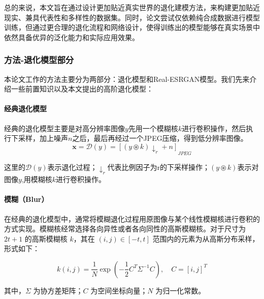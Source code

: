 \documentclass[12pt,AutoFakeBold]{article}
\begin{document}
总的来说，本文旨在通过设计更加贴近真实世界的退化建模方法，来构建更加贴近现实、兼具代表性和多样性的数据集。同时，论文尝试仅依赖纯合成数据进行模型训练，但通过更合理的退化流程和网络设计，使得训练出的模型能够在真实场景中依然具备优异的泛化能力和实际应用效果。






\subsubsection{方法-退化模型部分}

本论文工作的方法主要分为两部分：退化模型和Real-ESRGAN模型。我们先来介绍一些前置知识以及本文提出的高阶退化模型：

\paragraph{经典退化模型}

经典的退化模型主要是对高分辨率图像$y$先用一个模糊核$k$进行卷积操作，然后执行下采样，加上噪声$n$之后，最后再经过一个JPEG压缩，得到低分辨率图像。
\[
\mathbf{x} = \mathcal{D}(y) = \left[ ( y \circledast k ) \downarrow_r + n \right]_{JPEG}
\]

{\small 这里的$\mathcal{D}(y)$表示退化过程；$\downarrow_r$代表比例因子为r的下采样操作；$( y \circledast k )$表示对图像$y$,用模糊核$k$进行卷积操作。}


\paragraph{模糊（Blur）}
在经典的退化模型中，通常将模糊退化过程用原图像与某个线性模糊核进行卷积的方式实现。模糊核经常选择各向异性或者各向同性的高斯模糊核。对于尺寸为 \(2t + 1\) 的高斯模糊核 \(k\)，其在 \((i, j) \in [-t, t]\) 范围内的元素为从高斯分布采样，形式如下：

\[
k(i,j) = \frac{1}{N} \exp \left( -\frac{1}{2} C^{T} \Sigma^{-1} C \right),
\quad C = [i, j]^{T}
\]

{\small 其中，\(\Sigma\) 为协方差矩阵；\(C\) 为空间坐标向量；\(N\) 为归一化常数。}
\end{document}
